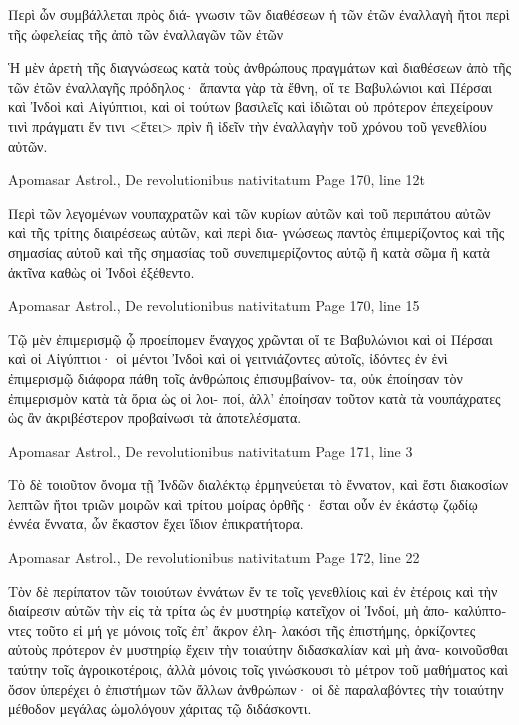 \documentclass[12pt,letterpaper,twoside,final]{memoir}
\begin{document}
\begin{greek}
              Περὶ ὧν συμβάλλεται πρὸς διά-
γνωσιν τῶν διαθέσεων ἡ τῶν ἐτῶν ἐναλλαγὴ 
ἤτοι περὶ τῆς ὠφελείας τῆς ἀπὸ τῶν ἐναλλαγῶν 
τῶν ἐτῶν


 Ἡ μὲν ἀρετὴ τῆς διαγνώσεως κατὰ τοὺς ἀνθρώπους 
πραγμάτων καὶ διαθέσεων ἀπὸ τῆς τῶν ἐτῶν ἐναλλαγῆς 
πρόδηλος· ἅπαντα γὰρ τὰ ἔθνη, οἵ τε Βαβυλώνιοι καὶ Πέρσαι 
καὶ Ἰνδοὶ καὶ Αἰγύπτιοι, καὶ οἱ τούτων βασιλεῖς καὶ ἰδιῶται 
οὐ πρότερον ἐπεχείρουν τινὶ πράγματι ἔν τινι <ἔτει> πρὶν 
ἢ ἰδεῖν τὴν ἐναλλαγὴν τοῦ χρόνου τοῦ γενεθλίου αὐτῶν. 



Apomasar Astrol., De revolutionibus nativitatum 
Page 170, line 12t

              Περὶ τῶν λεγομένων νουπαχρατῶν 
καὶ τῶν κυρίων αὐτῶν καὶ τοῦ περιπάτου αὐτῶν 
καὶ τῆς τρίτης διαιρέσεως αὐτῶν, καὶ περὶ δια-
γνώσεως παντὸς ἐπιμερίζοντος καὶ τῆς σημασίας 
αὐτοῦ καὶ τῆς σημασίας τοῦ συνεπιμερίζοντος 
αὐτῷ ἢ κατὰ σῶμα ἢ κατὰ ἀκτῖνα καθὼς οἱ 
Ἰνδοὶ ἐξέθεντο. 



Apomasar Astrol., De revolutionibus nativitatum 
Page 170, line 15

Τῷ μὲν ἐπιμερισμῷ ᾧ προείπομεν ἔναγχος 
χρῶνται οἵ τε Βαβυλώνιοι καὶ οἱ Πέρσαι καὶ οἱ Αἰγύπτιοι· 
οἱ μέντοι Ἰνδοὶ καὶ οἱ γειτνιάζοντες αὐτοῖς, ἰδόντες ἐν ἑνὶ 
ἐπιμερισμῷ διάφορα πάθη τοῖς ἀνθρώποις ἐπισυμβαίνον-
τα, οὐκ ἐποίησαν τὸν ἐπιμερισμὸν κατὰ τὰ ὅρια ὡς οἱ λοι-
ποί, ἀλλ' ἐποίησαν τοῦτον κατὰ τὰ νουπάχρατες ὡς ἂν 
ἀκριβέστερον προβαίνωσι τὰ ἀποτελέσματα. 



Apomasar Astrol., De revolutionibus nativitatum 
Page 171, line 3

Τὸ δὲ τοιοῦτον ὄνομα τῇ Ἰνδῶν διαλέκτῳ ἑρμηνεύεται 
τὸ ἔννατον, καὶ ἔστι διακοσίων λεπτῶν ἤτοι τριῶν μοιρῶν 
καὶ τρίτου μοίρας ὀρθῆς· ἔσται οὖν ἐν ἑκάστῳ ζῳδίῳ 
ἐννέα ἔννατα, ὧν ἕκαστον ἔχει ἴδιον ἐπικρατήτορα. 



Apomasar Astrol., De revolutionibus nativitatum 
Page 172, line 22

Τὸν δὲ περίπατον τῶν τοιούτων ἐννάτων ἔν τε τοῖς 
γενεθλίοις καὶ ἐν ἑτέροις καὶ τὴν διαίρεσιν αὐτῶν τὴν εἰς 
τὰ τρίτα ὡς ἐν μυστηρίῳ κατεῖχον οἱ Ἰνδοί, μὴ ἀπο-
καλύπτοντες τοῦτο εἰ μή γε μόνοις τοῖς ἐπ' ἄκρον ἐλη-
λακόσι τῆς ἐπιστήμης, ὁρκίζοντες αὐτοὺς πρότερον ἐν 
μυστηρίῳ ἔχειν τὴν τοιαύτην διδασκαλίαν καὶ μὴ ἀνα-
κοινοῦσθαι ταύτην τοῖς ἀγροικοτέροις, ἀλλὰ μόνοις τοῖς   
γινώσκουσι τὸ μέτρον τοῦ μαθήματος καὶ ὅσον ὑπερέχει 
ὁ ἐπιστήμων τῶν ἄλλων ἀνθρώπων· οἱ δὲ παραλαβόντες 
τὴν τοιαύτην μέθοδον μεγάλας ὡμολόγουν χάριτας τῷ 
διδάσκοντι. 




\end{greek}
\end{document}
